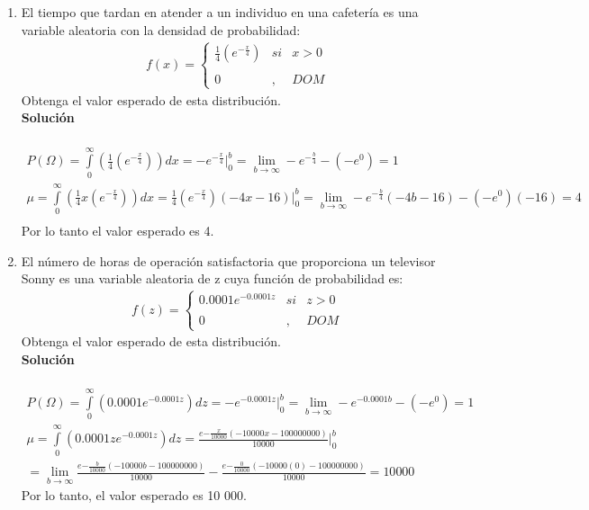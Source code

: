 \begin{enumerate}
    \item El tiempo que tardan en atender a un individuo en una cafetería es una variable aleatoria con la densidad de probabilidad: \\
    \begin{align*}
    f(x)= \left\{ \begin{array}{lcc}
    \frac{1}{4}(e^{-\frac{x}{4}}) &   si  & x > 0 \\
    \\ 0 &  ,  & DOM
    \end{array}
    \right.
    \end{align*}
    Obtenga el valor esperado de esta distribución.
    \\\textbf{Solución}
    \\ \\
    \begin{gather*}
    P(\Omega) = \int \limits_{0}^\infty (\frac{1}{4}(e^{-\frac{x}{4}})) dx = -e^{-\frac{x}{4}} \bigg\vert_{0}^{b} = \lim \limits_{b \rightarrow \infty} -e^{-\frac{b}{4}} - (-e^{0}) = 1 \\
    \mu = \int \limits_{0}^\infty (\frac{1}{4}x(e^{-\frac{x}{4}})) dx = \frac{1}{4}(e^{-\frac{x}{4}})(-4x-16) \bigg\vert_{0}^b = \lim \limits_{b \rightarrow \infty} -e^{-\frac{b}{4}}(-4b -16) - (-e^{0})(-16) = 4 \\
    \end{gather*}
    Por lo tanto el valor esperado es 4. \\
    
    \item El número de horas de operación satisfactoria que proporciona un televisor Sonny es una variable aleatoria de z cuya función de probabilidad es: \\
    \begin{align*}
    f(z)= \left\{ \begin{array}{lcc}
    0.0001e^{-0.0001z} &   si  & z > 0 \\
    \\ 0 &  ,  & DOM
    \end{array}
    \right.
    \end{align*}
    Obtenga el valor esperado de esta distribución.
    \\\textbf{Solución}
    \\ \\
    \begin{gather*}
    P(\Omega) = \int \limits_{0}^{\infty} (0.0001e^{-0.0001z}) dz = -e^{-0.0001z} \bigg\vert_{0}^{b} = \lim \limits_{b \rightarrow \infty} -e^{-0.0001b} - (-e^{0}) = 1 \\
    \mu = \int \limits_{0}^{\infty} (0.0001ze^{-0.0001z}) dz = \frac{e{-\frac{x}{10 000}}(-10 000x - 100 000 000)}{10 000} \bigg\vert_{0}^b \\
    = \lim \limits_{b \rightarrow \infty} \frac{e{-\frac{b}{10 000}}(-10 000b - 100 000 000)}{10 000} - \frac{e{-\frac{0}{10 000}}(-10 000(0) - 100 000 000)}{10 000} = 10 000
    \end{gather*}
    Por lo tanto, el valor esperado es 10 000.
    
\end{enumerate}